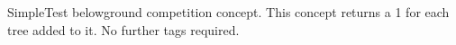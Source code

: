 Simple\+Test belowground competition concept. This concept returns a 1 for each tree added to it. No further tags required. 